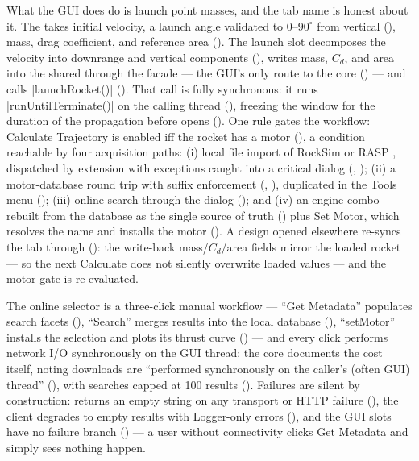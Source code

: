 What the GUI does do is launch point masses, and the tab name is honest about it. The
 takes initial velocity, a launch angle validated to $0$--$90^{\circ}$ from
vertical (), mass, drag coefficient, and reference area
(). The launch slot decomposes the velocity into downrange and
vertical components (), writes mass, $C_d$, and area into the shared
 through the  facade --- the GUI's only route to the core
() --- and calls \cppinline|launchRocket()|
(). That call is fully synchronous: it runs
\cppinline|runUntilTerminate()| on the calling thread (), freezing the window
for the duration of the propagation before  opens
(). One rule gates the workflow: Calculate Trajectory is enabled
iff the rocket has a motor (), a condition reachable by four
acquisition paths: (i) local file import of RockSim  or RASP , dispatched by
extension with exceptions caught into a critical dialog (,
); (ii) a  motor-database round trip with suffix
enforcement (, ), duplicated in
the Tools menu (); (iii) online search through the
 dialog (); and (iv) an engine
combo rebuilt from the database as the single source of truth ()
plus Set Motor, which resolves the name and installs the motor ().
A design opened elsewhere re-syncs the tab through 
(): the write-back mass/$C_d$/area fields mirror the loaded rocket
--- so the next Calculate does not silently overwrite loaded values --- and the motor gate is
re-evaluated.

The online selector is a three-click manual workflow --- ``Get Metadata'' populates search facets
(), ``Search'' merges results into the local database
(), ``setMotor'' installs the selection and plots its
thrust curve () --- and every click performs network I/O
synchronously on the GUI thread; the core documents the cost itself, noting downloads are
``performed synchronously on the caller's (often GUI) thread''
(), with searches capped at 100 results
(). Failures are silent by construction:
 returns an empty string on any transport or HTTP failure
(), the client degrades to empty results with Logger-only errors
(), and the GUI slots have no failure branch
() --- a user without connectivity clicks Get Metadata
and simply sees nothing happen.

